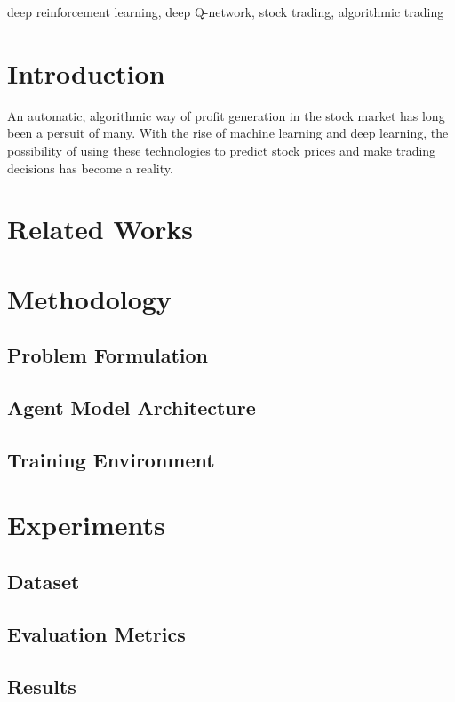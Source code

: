 \documentclass[conference]{IEEEtran}
\begin{document}
\begin{IEEEkeywords}
deep reinforcement learning, deep Q-network, stock trading, algorithmic trading
\end{IEEEkeywords}

\section{Introduction}
An automatic, algorithmic way of profit generation in the stock market has long been a persuit of many. With the rise of machine learning and deep learning, the possibility of using these technologies to predict stock prices and make trading decisions has become a reality.

\section{Related Works}

\section{Methodology}

\subsection{Problem Formulation}

\subsection{Agent Model Architecture}

\subsection{Training Environment}

\section{Experiments}

\subsection{Dataset}

\subsection{Evaluation Metrics}

\subsection{Results}
\end{document}
